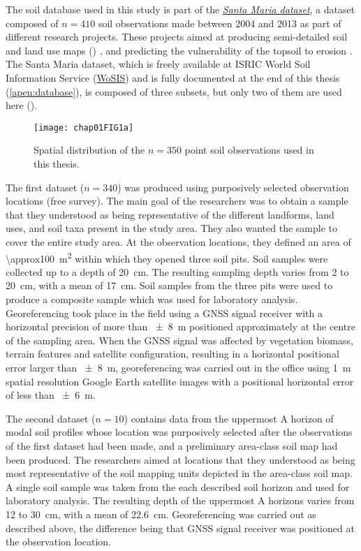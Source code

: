 The soil database used in this study is part of the 
\hyperref[apen:database]{\textit{Santa Maria dataset}}, a dataset composed of $n = 410$ soil 
observations made between \num{2004} and \num{2013} as part of different research
projects. These projects aimed at producing semi-detailed soil and land use maps () 
\citep{Pedron2005, Miguel2010, SamuelRosaEtAl2011a, MiguelEtAl2012, Samuel-RosaEtAl2013}, and 
predicting the vulnerability of the topsoil to erosion \citep{MouraBueno2012, Miguel2013}. 
The Santa Maria dataset, which is freely available at ISRIC World Soil Information Service 
(\href{http://www.isric.org/data/wosis}{WoSIS}) and is fully documented at the end of this thesis
(\autoref{apen:database}), is composed of three subsets, but only two of them are used here 
().

\begin{figure}[!ht]
  \centering
  \texttt{[image: chap01FIG1a]}
  \caption{Spatial distribution of the $n = 350$ point soil observations used in this thesis.}
  \label{fig:intro-database}
\end{figure}

The first dataset ($n = 340$) was produced using purposively selected observation locations (free 
survey). The main goal of the researchers was to obtain a sample that they understood as being 
representative of the different landforms, land uses, and soil taxa present in the study area. They 
also wanted the sample to cover the entire study area. At the observation locations, they defined 
an area of \SI{\approx100}{\metre\squared} within which they opened three soil pits. Soil samples 
were collected up to a depth of \SI{20}{\centi\metre}. The resulting sampling depth varies from 
\num{2} to \SI{20}{\centi\metre}, with a mean of \SI{17}{\centi\metre}. Soil samples from the three 
pits were used to produce a composite sample which was used for laboratory analysis. Georeferencing 
took place in the field using a GNSS signal receiver with a horizontal precision of more than 
\SI{\pm8}{\metre} positioned approximately at the centre of the sampling area. When the GNSS signal 
was affected by vegetation biomass, terrain features and satellite configuration, resulting in a 
horizontal positional error larger than \SI{\pm8}{\metre}, georeferencing was carried out in the 
office using \SI{1}{\metre} spatial resolution Google Earth satellite images with a positional 
horizontal error of less than \SI{\pm6}{\metre}.

The second dataset ($n = 10$) contains data from the uppermost A horizon of modal soil profiles 
whose location was purposively selected after the observations of the first dataset had been made, 
and a preliminary area-class soil map had been produced. The researchers aimed at locations that 
they understood as being most representative of the soil mapping units depicted in the area-class 
soil map. A single soil sample was taken from the each described soil horizon and used for 
laboratory analysis. The resulting depth of the uppermost A horizons varies from \num{12} to 
\SI{30}{\centi\metre}, with a mean of \SI{22.6}{\centi\metre}. Georeferencing was carried out as 
described above, the difference being that GNSS signal receiver was positioned at the observation 
location.

